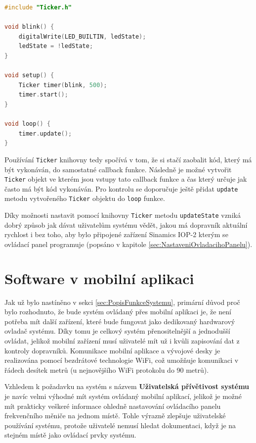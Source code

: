 \begin{lstlisting}[language=C++, caption={Způsob používání \texttt{Ticker} knihovny}, label={lst:TickerKnihovnaExample}]
#include "Ticker.h"

void blink() {
	digitalWrite(LED_BUILTIN, ledState);
	ledState = !ledState;
}

void setup() {
	Ticker timer(blink, 500);
	timer.start();
}

void loop() {
	timer.update();
}
\end{lstlisting}

Používání \texttt{Ticker} knihovny tedy spočívá v tom, že si stačí zaobalit kód, který má být vykonáván, do samostatné callback funkce. Následně je možné vytvořit \texttt{Ticker} objekt ve kterém jsou vstupy tato callback funkce a čas který určuje jak často má být kód vykonáván. Pro kontrolu se doporučuje ještě přidat \texttt{update} metodu vytvořeného \texttt{Ticker} objektu do \texttt{loop} funkce.

Díky možnosti nastavit pomocí knihovny \texttt{Ticker} metodu \texttt{updateState} vzniká dobrý způsob jak dávat uživatelům systému vědět, jakou má dopravník aktuální rychlost i bez toho, aby bylo připojené zařízení Sinamics IOP-2 kterým se ovládací panel programuje (popsáno v kapitole \ref{sec:NastaveniOvladacihoPanelu}).

\section{Software v mobilní aplikaci}\label{sec:SoftwareVMobilniAplikaci}

Jak už bylo nastíněno v sekci \ref{sec:PopisFunkceSystemu}, primární důvod proč bylo rozhodnuto, že bude systém ovládaný přes mobilní aplikaci je, že není potřeba mít další zařízení, které bude fungovat jako dedikovaný hardwarový ovladač systému. Díky tomu je celkový systém přenositelnější a jednodušší ovládat, jelikož mobilní zařízení musí uživatelé mít už i kvůli zapisování dat z kontroly dopravníků. Komunikace mobilní aplikace a vývojové desky je realizována pomocí bezdrátové technologie WiFi, což umožňuje komunikaci v řádech desítek metrů (u nejnovějšího WiFi protokolu do 90 metrů).
\cite{DosahWIFIProtokolu}

Vzhledem k požadavku na systém s názvem \textbf{Uživatelská přívětivost systému} je navíc velmi výhodné mít systém ovládaný mobilní aplikací, jelikož je možné mít prakticky veškeré informace ohledně nastavování ovládacího panelu frekvenčního měniče na jednom místě. Tohle výrazně zlepšuje uživatelské používání systému, protože uživatelé nemusí hledat dokumentaci, když je na stejném místě jako ovládací prvky systému.

